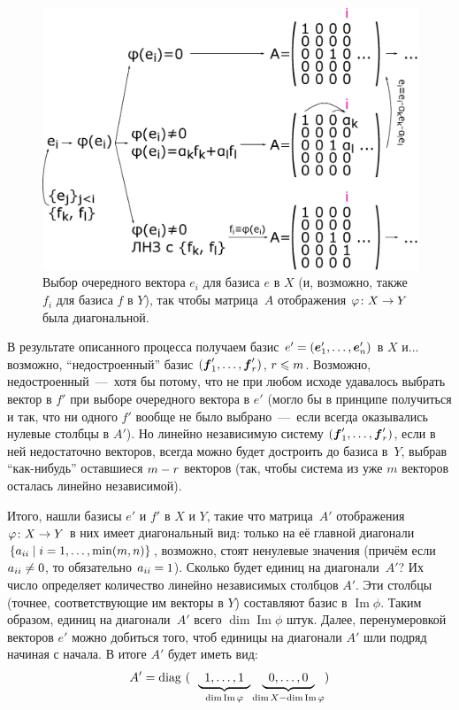 \documentclass[a4paper,12pt]{article}
\DeclareMathOperator{\Imag}{Im}
\begin{document}
  \begin{figure}[h]
    \centering
  
    \includegraphics[width=0.9\columnwidth]{map-x-y-diag-scheme}
  
    \caption{Выбор очередного вектора $e_i$ для базиса $e$ в $X$ (и, возможно, также $f_i$ для базиса $f$ в $Y$), так чтобы матрица~$A$ отображения $\phi\colon X \hm\to Y$ была диагональной.}
    \label{fig:map-x-y-diag-scheme}
  \end{figure}
  
  В результате описанного процесса получаем базис $e' \hm= (\bds e_1', \ldots, \bds e_n')$ в $X$ и... возможно, ``недостроенный'' базис $(\boldsymbol f_1', \ldots, \boldsymbol f_r')$, $r \hm\leq m$.
  Возможно, недостроенный~---~хотя бы потому, что не при любом исходе удавалось выбрать вектор в $f'$ при выборе очередного вектора в $e'$ (могло бы в принципе получиться и так, что ни одного $f'$ вообще не было выбрано~---~если всегда оказывались нулевые столбцы в $A'$).
  Но линейно независимую систему $(\boldsymbol f_1', \ldots, \boldsymbol f_r')$, если в ней недостаточно векторов, всегда можно будет достроить до базиса в~$Y$, выбрав ``как-нибудь'' оставшиеся $m \hm- r$ векторов (так, чтобы система из уже $m$ векторов осталась линейно независимой).
  
  Итого, нашли базисы $e'$ и $f'$ в $X$ и $Y$, такие что матрица~$A'$ отображения $\phi\colon X \hm\to Y$ в них имеет диагональный вид: только на её главной диагонали $\{a_{ii} \hm\mid i \hm= 1, \ldots, \min(m, n)\}$, возможно, стоят ненулевые значения (причём если $a_{ii} \hm{\not=} 0$, то обязательно $a_{ii} \hm= 1$).
  Сколько будет единиц на диагонали~$A'$?
  Их число определяет количество линейно независимых столбцов $A'$.
  Эти столбцы (точнее, соответствующие им векторы в $Y$) составляют базис в $\Imag \phi$.
  Таким образом, единиц на диагонали~$A'$ всего $\dim \Imag \phi$ штук.
  Далее, перенумеровкой векторов $e'$ можно добиться того, чтоб единицы на диагонали $A'$ шли подряд начиная с начала.
  В итоге $A'$ будет иметь вид:
  \begin{equation}\label{eq:matrix-diag-view}
    A' = \diag\ (
      \hphantom{\hspace{0.5em}}\underbrace{\hphantom{1}1, \ldots, 1\hphantom{1}}_{\dim\Imag\phi}
      \underbrace{\hphantom{1}0, \ldots, 0\hphantom{1}}_{\dim X - \dim\Imag\phi}
    )
  \end{equation}  %
  
\end{document}
